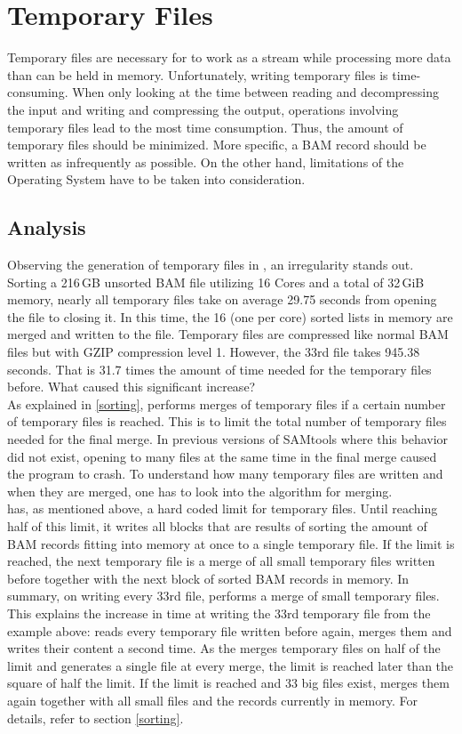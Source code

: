 \section{Temporary Files} 

Temporary files are necessary for \sort to work as a stream while processing more data than can be held in memory. Unfortunately, writing temporary files is time-consuming. When only looking at the time between reading and decompressing the input and writing and compressing the output, operations involving temporary files lead to the most time consumption. Thus, the amount of temporary files should be minimized. More specific, a BAM record should be written as infrequently as possible. On the other hand, limitations of the Operating System have to be taken into consideration.

\subsection{Analysis}
Observing the generation of temporary files in \sort, an irregularity stands out. Sorting a 216\,GB unsorted BAM file utilizing 16 Cores and a total of 32\,GiB memory, nearly all temporary files take on average 29.75 seconds from opening the file to closing it. In this time, the 16 (one per core) sorted lists in memory are merged and written to the file. Temporary files are compressed like normal BAM files but with GZIP compression level 1. However, the 33rd file takes 945.38 seconds. That is 31.7 times the amount of time needed for the temporary files before. What caused this significant increase? \\
As explained in \ref{sorting}, \sort performs merges of temporary files if a certain number of temporary files is reached. This is to limit the total number of temporary files needed for the final merge. In previous versions of SAMtools where this behavior did not exist, opening to many files at the same time in the final merge caused the program to crash.
To understand how many temporary files are written and when they are merged, one has to look into the algorithm for merging. \\
\sort has, as mentioned above, a hard coded limit for temporary files. Until reaching half of this limit, it writes all blocks that are results of sorting the amount of BAM records fitting into memory at once to a single temporary file. If the limit is reached, the next temporary file is a merge of all small temporary files written before together with the next block of sorted BAM records in memory. In summary, on writing every 33rd file, \sort performs a merge of small temporary files. This explains the increase in time at writing the 33rd temporary file from the example above: \sort reads every temporary file written before again, merges them and writes their content a second time. As the \sort merges temporary files on half of the limit and generates a single file at every merge, the limit is reached later than the square of half the limit. If the limit is reached and 33 big files exist, \sort merges them again together with all small files and the records currently in memory. For details, refer to section \ref{sorting}. \\
